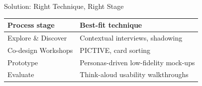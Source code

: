 \documentclass[aspectratio=169]{beamer}
\begin{document}
\begin{frame}{Solution: Right Technique, Right Stage}
\begin{center}
\begin{tabular}{@{}ll@{}}
\toprule
\textbf{Process stage} & \textbf{Best-fit technique} \\
\midrule
Explore \& Discover & Contextual interviews, shadowing \\
Co-design Workshops & PICTIVE, card sorting \\
Prototype & Personas-driven low-fidelity mock-ups \\
Evaluate & Think-aloud usability walkthroughs \\
\bottomrule
\end{tabular}
\end{center}
\end{frame}
\end{document}
